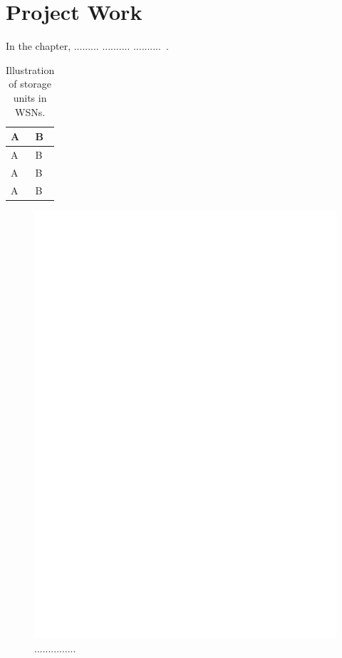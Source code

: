 \chapter{Project Work}\label{final}

In the chapter, ......... .......... ..........~\cite{AmmariD08}.
 \begin{table}
\begin{center}
\begin{tabular}{|l|l|}  \hline
A & B \\ \hline
A & B \\ \hline
A & B \\ \hline
A & B \\ \hline
\end{tabular}\label{cht2}
\end{center}
\caption{Illustration of storage units in WSNs.}
\end{table}

\begin{figure}
\begin{center}
\includegraphics[scale=.5]{1.eps}
\caption{...............}
\label{chap7Fig:2}
\end{center}
\end{figure}
 

